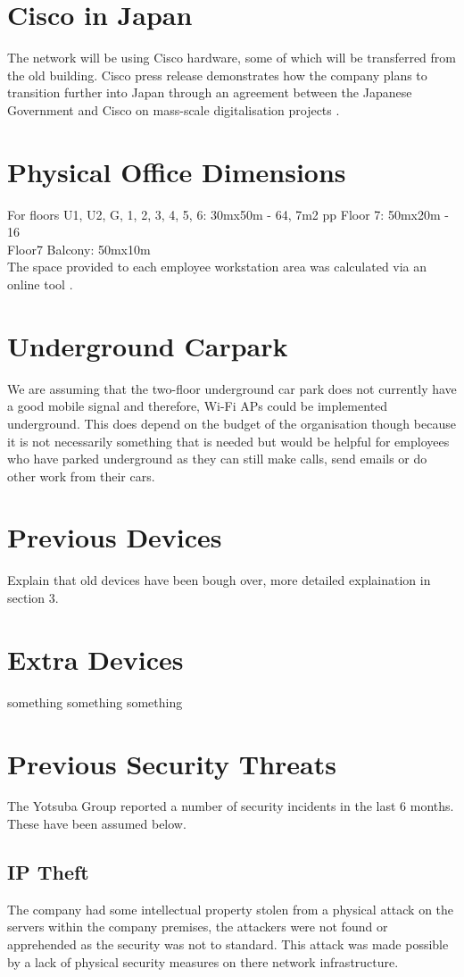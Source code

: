 \section{Cisco in Japan}
The network will be using Cisco hardware, some of which will be transferred from the old 
building. Cisco press release demonstrates how the company plans to transition further into Japan through an agreement between the Japanese Government and Cisco on mass-scale digitalisation projects \parencite{cisco-japan}.
\section{Physical Office Dimensions}
For floors U1, U2, G, 1, 2, 3, 4, 5, 6: 30mx50m - 64, 7m2 pp
Floor 7: 50mx20m - 16 \\
Floor7 Balcony: 50mx10m \\
The space provided to each employee workstation area was calculated via an online tool \parencite{floor-space}.
\section{Underground Carpark}
We are assuming that the two-floor underground car park does not currently have a good mobile signal and therefore, Wi-Fi APs could be implemented underground. This does depend on the budget of the organisation though because it is not necessarily something that is needed but would be helpful for employees who have parked underground as they can still make calls, send emails or do other work from their cars.
\section{Previous Devices}
Explain that old devices have been bough over, more detailed explaination in section 3.
\section{Extra Devices}
something something something
\section{Previous Security Threats}
The Yotsuba Group reported a number of security incidents in the last 6 months. These have been assumed below.
\subsection{IP Theft}
The company had some intellectual property stolen from a physical attack on the servers within the company premises, the attackers were not found or apprehended as the security was not to standard. This attack was made possible by a lack of physical security measures on there network infrastructure.
